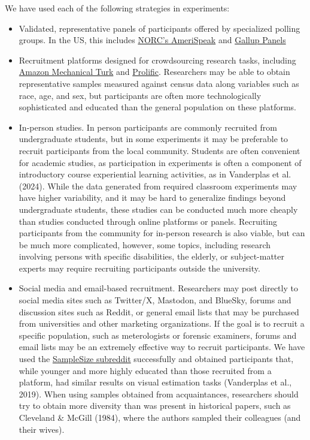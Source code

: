 \documentclass[
  10pt,
]{article}
\begin{document}
We have used each of the following strategies in experiments:

\begin{itemize}
\item
  Validated, representative panels of participants offered by
  specialized polling groups. In the US, this includes
  \href{https://amerispeak.norc.org/us/en/amerispeak/about-amerispeak/panel-design.html}{NORC's
  AmeriSpeak} and
  \href{https://www.gallup.com/analytics/318911/us-social-research.aspx}{Gallup
  Panels}
\item
  Recruitment platforms designed for crowdsourcing research tasks,
  including \href{https://www.mturk.com/}{Amazon Mechanical Turk} and
  \href{https://www.prolific.com/}{Prolific}. Researchers may be able to
  obtain representative samples measured against census data along
  variables such as race, age, and sex, but participants are often more
  technologically sophisticated and educated than the general population
  on these platforms.
\item
  In-person studies. In person participants are commonly recruited from
  undergraduate students, but in some experiments it may be preferable
  to recruit participants from the local community. Students are often
  convenient for academic studies, as participation in experiments is
  often a component of introductory course experiential learning
  activities, as in Vanderplas et al. (2024). While the data generated
  from required classroom experiments may have higher variability, and
  it may be hard to generalize findings beyond undergraduate students,
  these studies can be conducted much more cheaply than studies
  conducted through online platforms or panels. Recruiting participants
  from the community for in-person research is also viable, but can be
  much more complicated, however, some topics, including research
  involving persons with specific disabilities, the elderly, or
  subject-matter experts may require recruiting participants outside the
  university.
\item
  Social media and email-based recruitment. Researchers may post
  directly to social media sites such as Twitter/X, Mastodon, and
  BlueSky, forums and discussion sites such as Reddit, or general email
  lists that may be purchased from universities and other marketing
  organizations. If the goal is to recruit a specific population, such
  as meterologists or forensic examiners, forums and email lists may be
  an extremely effective way to recruit participants. We have used the
  \href{https://web.archive.org/web/20250228110244/https://www.reddit.com/r/SampleSize/}{SampleSize
  subreddit} successfully and obtained participants that, while younger
  and more highly educated than those recruited from a platform, had
  similar results on visual estimation tasks (Vanderplas et al., 2019).
  When using samples obtained from acquaintances, researchers should try
  to obtain more diversity than was present in historical papers, such
  as Cleveland \& McGill (1984), where the authors sampled their
  colleagues (and their wives).
\end{itemize}
\end{document}
